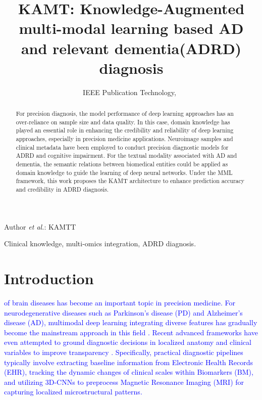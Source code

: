 \documentclass[lettersize,journal]{IEEEtran}
\begin{document}
\title{KAMT: Knowledge-Augmented multi-modal learning based AD and relevant dementia(ADRD) diagnosis}



\author{IEEE Publication Technology,~
        
}

%
{Author \MakeLowercase{\textit{et al.}}: KAMTT}



\maketitle

\begin{abstract}
        For precision diagnosis, the model performance of deep learning approaches has an over-reliance on sample size and data quality.
        In this case, domain knowledge has played an essential role in enhancing the credibility and reliability of deep learning approaches, especially in precision medicine applications. Neuroimage samples and clinical metadata have been employed to conduct precision diagnostic models for ADRD and cognitive impairment. For the textual modality associated with AD and dementia, the semantic relations between biomedical entities could be applied as domain knowledge to guide the learning of deep neural networks. Under the MML framework, this work proposes the KAMT architecture to enhance prediction accuracy and credibility in ADRD diagnosis.   
        
\end{abstract}

\begin{IEEEkeywords}
	Clinical knowledge, multi-omics integration, ADRD diagnosis.
\end{IEEEkeywords}

\section{Introduction}
\label{sec:introduction}

    \textcolor{blue}{ of brain diseases has become an important topic in precision medicine. For neurodegenerative diseases such as Parkinson's disease (PD) and Alzheimer's disease (AD), multimodal deep learning integrating diverse features has gradually become the mainstream approach in this field \cite{qiu2022multimodal,zhang2026multimodalpd}. Recent advanced frameworks have even attempted to ground diagnostic decisions in localized anatomy and clinical variables to improve transparency \cite{lin2025adlip,wood2026align}. Specifically, practical diagnostic pipelines typically involve extracting baseline information from Electronic Health Records (EHR)\cite{rajkomar2018scalable}, tracking the dynamic changes of clinical scales within Biomarkers (BM)\cite{marek2011parkinson}, and utilizing 3D-CNNs \cite{basaia2019automated} to preprocess Magnetic Resonance Imaging (MRI) for capturing localized microstructural patterns.}
\end{document}

